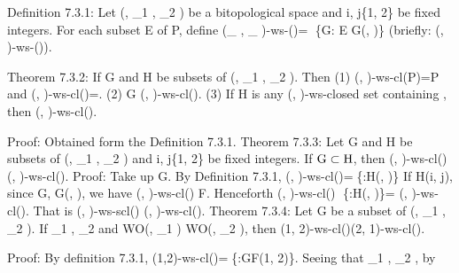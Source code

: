 Definition 7.3.1: Let (\TSP, \tau_1 , \tau_2 ) be a bitopological space and i, j\in\{1, 2\} be fixed integers. For
each subset E of P, define (\tau_{\TSi} , \tau_{\TSj} )-ws-\cl(\TSE)= \{G: E \subset G\inD \ws (\TSi, \TSj)\} (briefly: (\TSi, \TSj)-ws-\cl(\TSE)).

Theorem 7.3.2: If G and H be subsets of (\TSP, \tau_1 , \tau_2 ). Then
(1) (\TSi, \TSj)-ws-cl(P)=P and (\TSi, \TSj)-ws-cl(\phi)=\phi.
(2) G \subset (\TSi, \TSj)-ws-cl(\TSG).
(3) If H is any (\TSi, \TSj)-ws-closed set containing \TSG, then (\TSi, \TSj)-ws-cl(\TSG)\subsetH.

Proof: Obtained form the Definition 7.3.1.
Theorem 7.3.3: Let G and H be subsets of (\TSP, \tau_1 , \tau_2 ) and i, j\in\{1, 2\} be fixed integers. If $\mathrm{G} \subset \mathrm{H}$, then (\TSi, \TSj)-ws-cl(\TSG) \subset (\TSi, \TSj)-ws-cl(\TSH).
Proof: Take up G\subsetH. By Definition 7.3.1, (\TSi, \TSj)-ws-cl(\TSH)=\{\TSF:H\subsetF\inD \ws (\TSi, \TSj)\} If H\subsetF\inD \ws (i,
j), since G\subsetH, G\subsetH\subsetF\inD \ws (\TSi, \TSj), we have (\TSi, \TSj)-ws-cl(\TSG) \subset F. Henceforth (\TSi, \TSj)-ws-cl(\TSG) \subset
\{\TSF:H\subsetF\inD \ws (\TSi, \TSj)\}= (\TSi, \TSj)-ws-cl(\TSH). That is (\TSi, \TSj)-ws-scl(\TSG) \subset (\TSi, \TSj)-ws-cl(\TSH).
Theorem 7.3.4: Let G be a subset of (\TSP, \tau_1 , \tau_2 ). If \tau_1 , \subset \tau_2 and WO(\TSP, \tau_1 ) \subset WO(\TSP, \tau_2 ), then (1,
2)-ws-cl(\TSG)\subset (2, 1)-ws-cl(\TSG).

Proof: By definition 7.3.1, (1,2)-ws-cl(\TSG)=\{\TSF:G\subset F\inD \ws (1, 2)\}. Seeing that \tau_1 , \subset \tau_2 , by

